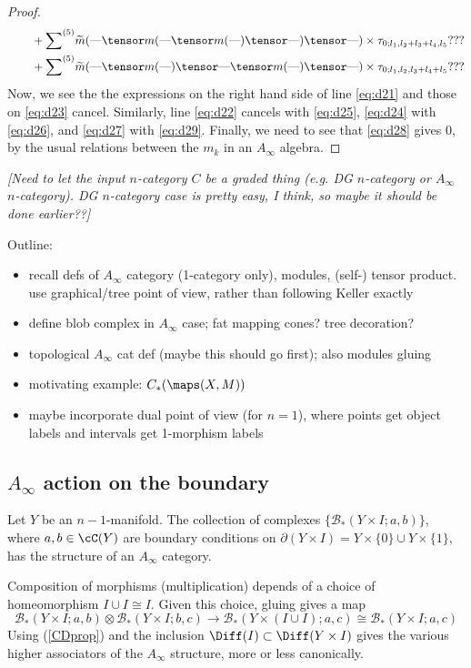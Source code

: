\documentclass[11pt,leqno]{amsart}
\def\bc{{\mathcal B}}
\def\bd{\partial}
\def\sub{\subset}
\def\nn#1{{{\it \small [#1]}}}
\newcommand{\eq}[1]{\begin{displaymath}#1\end{displaymath}}
\begin{document}
\begin{proof}
\begin{align}
\label{eq:d28} & \qquad + \ssum{5} \tm(\T \tensor m(\T \tensor m(\T) \tensor \T) \tensor \T) \times \tau_{0;l_1,l_2+l_3+l_4,l_5} ??? \\
\label{eq:d29} & \qquad + \ssum{5} \tm(\T \tensor m(\T) \tensor \T \tensor m(\T) \tensor \T) \times \tau_{0;l_1,l_2,l_3+l_4+l_5} ???
\end{align}
Now, we see the the expressions on the right hand side of line \eqref{eq:d21} and those on \eqref{eq:d23} cancel. Similarly, line \eqref{eq:d22} cancels
with \eqref{eq:d25}, \eqref{eq:d24} with \eqref{eq:d26}, and \eqref{eq:d27} with \eqref{eq:d29}. Finally, we need to see that \eqref{eq:d28} gives $0$,
by the usual relations between the $m_k$ in an $A_\infty$ algebra.
\end{proof}

\nn{Need to let the input $n$-category $C$ be a graded thing (e.g. DG
$n$-category or $A_\infty$ $n$-category). DG $n$-category case is pretty
easy, I think, so maybe it should be done earlier??}

\bigskip

Outline:
\begin{itemize}
\item recall defs of $A_\infty$ category (1-category only), modules, (self-) tensor product.
use graphical/tree point of view, rather than following Keller exactly
\item define blob complex in $A_\infty$ case; fat mapping cones?  tree decoration?
\item topological $A_\infty$ cat def (maybe this should go first); also modules gluing
\item motivating example: $C_*(\maps(X, M))$
\item maybe incorporate dual point of view (for $n=1$), where points get
object labels and intervals get 1-morphism labels
\end{itemize}


\subsection{$A_\infty$ action on the boundary}

Let $Y$ be an $n{-}1$-manifold.
The collection of complexes $\{\bc_*(Y\times I; a, b)\}$, where $a, b \in \cC(Y)$ are boundary
conditions on $\bd(Y\times I) = Y\times \{0\} \cup Y\times\{1\}$, has the structure
of an $A_\infty$ category.

Composition of morphisms (multiplication) depends of a choice of homeomorphism
$I\cup I \cong I$.  Given this choice, gluing gives a map
\eq{
    \bc_*(Y\times I; a, b) \otimes \bc_*(Y\times I; b, c) \to \bc_*(Y\times (I\cup I); a, c)
            \cong \bc_*(Y\times I; a, c)
}
Using (\ref{CDprop}) and the inclusion $\Diff(I) \sub \Diff(Y\times I)$ gives the various
higher associators of the $A_\infty$ structure, more or less canonically.
\end{document}
